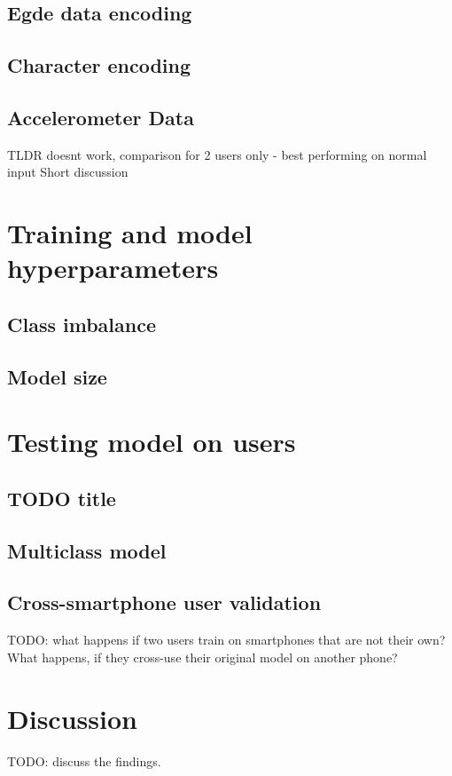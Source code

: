 \subsection{Egde data encoding}

\subsection{Character encoding}

\subsection{Accelerometer Data}
TLDR doesnt work, comparison for 2 users only - best performing on normal input
Short discussion

\section{Training and model hyperparameters}

\subsection{Class imbalance}

\subsection{Model size}


\section{Testing model on users}

\subsection{TODO title}

\subsection{Multiclass model}


\subsection{Cross-smartphone user validation}
TODO: what happens if two users train on smartphones that are not their own? What happens, if they cross-use their original model on another phone?

\section{Discussion}
TODO: discuss the findings.